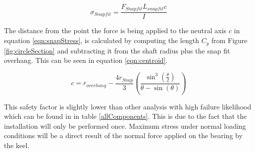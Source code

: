 \documentclass[../main.tex]{subfiles}
\begin{document}
\begin{equation}
\label{eqn:snapStress}
\sigma_{Snapfit} = \frac{F_{Snapfit} L_{snapfit} c}{I}
\end{equation}

The distance from the point the force is being applied to the neutral axis $c$ in equation \ref{eqn:snapStress}, is calculated by computing the length $C_y$ from Figure \ref{fig:circleSection} and subtracting it from the shaft radius plus the snap fit overhang. This can be seen in equation \ref{eqn:centroid}. 

 \begin{equation}
 \label{eqn:centroid}
 c = r_{overhang} - \frac{4r_{Snap}}{3}\left(\frac{\sin^3\left(\frac{\theta}{2}\right)} {\theta-\sin(\theta)}\right)
 \end{equation}

 This safety factor is slightly lower than other analysis with high failure likelihood which can be found in in table \ref{allComponents}. This is due to the fact that the installation will only be performed once. Maximum stress under normal loading conditions will be a direct result of the normal force applied on the bearing by the keel.
\end{document}
